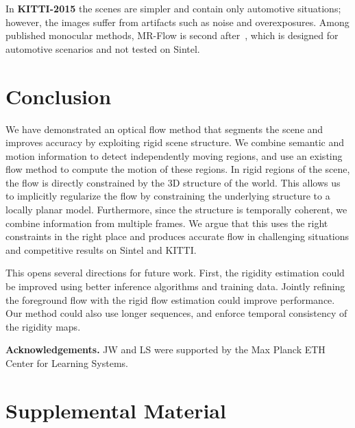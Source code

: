\documentclass[10pt,twocolumn,letterpaper]{article}
\begin{document}
In \textbf{KITTI-2015}
the scenes are simpler and contain only automotive situations; however, the images suffer from artifacts such as noise and overexposures.
Among published monocular methods, MR-Flow is second
after~\cite{Bai:2016:SemanticDeepFlow}, which is designed for
automotive scenarios and not tested on Sintel.
 \section{Conclusion}
\noindent
We have demonstrated an optical flow method that segments the scene
and  improves accuracy by exploiting rigid
scene structure.
We combine semantic and motion information to detect independently moving regions, and use an existing flow method to compute the motion of these regions.
In rigid regions of the scene, the flow is directly constrained by the 3D structure of the world.
This allows us to implicitly regularize the flow by constraining the underlying structure to a locally planar model.
Furthermore, since the structure is temporally coherent, we combine information from multiple frames.
We argue that this uses the right constraints in the right place and
produces accurate flow in challenging situations and competitive
results on Sintel and KITTI.


This opens several directions for future work.
First, the rigidity estimation could be improved using better
inference algorithms and training data.
Jointly refining the foreground flow with the rigid flow estimation could improve
performance.
Our method could also use longer sequences, and enforce temporal
consistency of the rigidity maps.

\noindent
{\small \textbf{Acknowledgements.} JW and LS were supported by the Max Planck ETH Center for Learning Systems.}















 







\pagebreak

{\small


}

\pagebreak
\appendix
\section{Supplemental Material}
\end{document}
